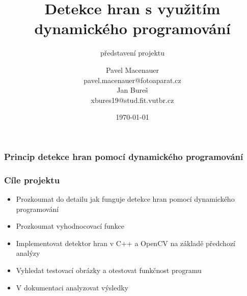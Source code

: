 \documentclass{beamer}
\title{\large{\textbf{Detekce hran s využitím dynamického programování}}}
\subtitle{\small{představení projektu}}
\author{Pavel Macenauer \\ \tiny{pavel.macenauer@fotoaparat.cz} \\ \normalsize{Jan Bureš} \\ \tiny{xbures19@stud.fit.vutbr.cz}}
\date{\tiny{\today}}
\institute[FIT VUTBR]
{
	\inst{}
	Fakulta Informačních Technologií \\
	Vysoké Učení Technické v Brně
}
\begin{document}
	\begin{frame}[t,plain]
	\titlepage

	\vspace{-7mm}
	\end{frame}


	\begin{frame}[t,fragile]
		\frametitle{Princip detekce hran pomocí dynamického programování}	
	\end{frame}
	

	\begin{frame}[t,fragile]
		\frametitle{Cíle projektu}	

		\begin{itemize}
			\item Prozkoumat do detailu jak funguje detekce hran pomocí dynamického programování
			\item Prozkoumat vyhodnocovací funkce
			\item Implementovat detektor hran v C++ a OpenCV na základě předchozí analýzy
			\item Vyhledat testovací obrázky a otestovat funkčnost programu
			\item V dokumentaci analyzovat výsledky
		\end{itemize}
	\end{frame}
	
\end{document}

